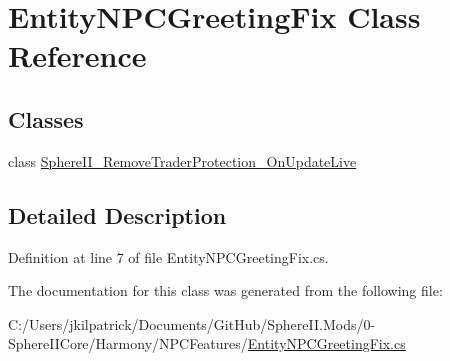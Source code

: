\hypertarget{class_entity_n_p_c_greeting_fix}{}\section{Entity\+N\+P\+C\+Greeting\+Fix Class Reference}
\label{class_entity_n_p_c_greeting_fix}
\subsection*{Classes}
\begin{DoxyCompactItemize}
\item 
class \mbox{\hyperlink{class_entity_n_p_c_greeting_fix_1_1_sphere_i_i___remove_trader_protection___on_update_live}{Sphere\+I\+I\+\_\+\+Remove\+Trader\+Protection\+\_\+\+On\+Update\+Live}}
\end{DoxyCompactItemize}


\subsection{Detailed Description}


Definition at line 7 of file Entity\+N\+P\+C\+Greeting\+Fix.\+cs.



The documentation for this class was generated from the following file\+:\begin{DoxyCompactItemize}
\item 
C\+:/\+Users/jkilpatrick/\+Documents/\+Git\+Hub/\+Sphere\+I\+I.\+Mods/0-\/\+Sphere\+I\+I\+Core/\+Harmony/\+N\+P\+C\+Features/\mbox{\hyperlink{_entity_n_p_c_greeting_fix_8cs}{Entity\+N\+P\+C\+Greeting\+Fix.\+cs}}\end{DoxyCompactItemize}
